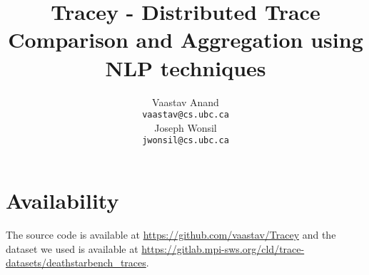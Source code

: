 \documentclass[11pt,a4paper]{article}
\title{Tracey - Distributed Trace Comparison and Aggregation using NLP techniques}
\author{Vaastav Anand\\
  {\tt vaastav@cs.ubc.ca} \\\And
  Joseph Wonsil \\
  {\tt jwonsil@cs.ubc.ca} \\}
\date{}
\begin{document}
\maketitle















\appendix

\section*{Availability}

The source code is available at \url{https://github.com/vaastav/Tracey}
and the dataset we used is available at \url{https://gitlab.mpi-sws.org/cld/trace-datasets/deathstarbench_traces}.
\end{document}
